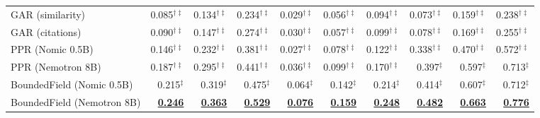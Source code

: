 \begin{table}[t]
\begin{subtable}{\textwidth}
\begin{tabular}{lrrrrrrrrr}
GAR (similarity) & 0.085$^{\dagger\ddagger}$ & 0.134$^{\dagger\ddagger}$ & 0.234$^{\dagger\ddagger}$ & 0.029$^{\dagger\ddagger}$ & 0.056$^{\dagger\ddagger}$ & 0.094$^{\dagger\ddagger}$ & 0.073$^{\dagger\ddagger}$ & 0.159$^{\dagger\ddagger}$ & 0.238$^{\dagger\ddagger}$ \\
GAR (citations) & 0.090$^{\dagger\ddagger}$ & 0.147$^{\dagger\ddagger}$ & 0.274$^{\dagger\ddagger}$ & 0.030$^{\dagger\ddagger}$ & 0.057$^{\dagger\ddagger}$ & 0.099$^{\dagger\ddagger}$ & 0.078$^{\dagger\ddagger}$ & 0.169$^{\dagger\ddagger}$ & 0.255$^{\dagger\ddagger}$ \\
PPR (Nomic 0.5B) & 0.146$^{\dagger\ddagger}$ & 0.232$^{\dagger\ddagger}$ & 0.381$^{\dagger\ddagger}$ & 0.027$^{\dagger\ddagger}$ & 0.078$^{\dagger\ddagger}$ & 0.122$^{\dagger\ddagger}$ & 0.338$^{\dagger\ddagger}$ & 0.470$^{\dagger\ddagger}$ & 0.572$^{\dagger\ddagger}$ \\
PPR (Nemotron 8B) & 0.187$^{\dagger\ddagger}$ & 0.295$^{\dagger\ddagger}$ & 0.441$^{\dagger\ddagger}$ & 0.036$^{\dagger\ddagger}$ & 0.099$^{\dagger\ddagger}$ & 0.170$^{\dagger\ddagger}$ & 0.397$^{\ddagger}$ & 0.597$^{\ddagger}$ & 0.713$^{\ddagger}$ \\
\midrule
BoundedField (Nomic 0.5B) & 0.215$^{\ddagger}$ & 0.319$^{\ddagger}$ & 0.475$^{\ddagger}$ & 0.064$^{\ddagger}$ & 0.142$^{\ddagger}$ & 0.214$^{\ddagger}$ & 0.414$^{\ddagger}$ & 0.607$^{\ddagger}$ & 0.712$^{\ddagger}$ \\
BoundedField (Nemotron 8B) & \underline{\textbf{0.246}} & \underline{\textbf{0.363}} & \underline{\textbf{0.529}} & \underline{\textbf{0.076}} & \underline{\textbf{0.159}} & \underline{\textbf{0.248}} & \underline{\textbf{0.482}} & \underline{\textbf{0.663}} & \underline{\textbf{0.776}} \\
\bottomrule

\end{tabular}
\end{subtable}
\end{table}
